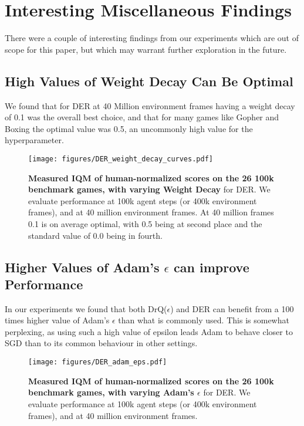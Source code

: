 \documentclass[10pt]{article} %
\begin{document}
\clearpage

\section{Interesting Miscellaneous Findings}
\label{sec:imf}
There were a couple of interesting findings from our experiments which are out of scope for this paper, but which may warrant further exploration in the future.

\subsection{High Values of Weight Decay Can Be Optimal}
We found that for DER at 40 Million environment frames having a weight decay of 0.1 was the overall best choice, and that for many games like Gopher and Boxing the optimal value was 0.5, an uncommonly high value for the hyperparameter. 
\begin{figure}[!ht]
    \centering
  \texttt{[image: figures/DER\_weight\_decay\_curves.pdf]}%
    \caption{
     \textbf{Measured IQM of human-normalized scores on the 26 100k benchmark games, with varying Weight Decay} for DER. We evaluate performance at 100k agent steps (or 400k environment frames), and at 40 million environment frames. At 40 million frames 0.1 is on average optimal, with 0.5 being at second place and the standard value of 0.0 being in fourth.
    }
    \label{fig:imf_wd}
\end{figure}

\subsection{Higher Values of Adam's $\epsilon$ can improve Performance}
In our experiments we found that both DrQ($\epsilon$) and DER can benefit from a 100 times higher value of Adam's $\epsilon$ than what is commonly used. This is somewhat perplexing, as using such a high value of epsilon leads Adam to behave closer to SGD than to its common behaviour in other settings.
\begin{figure}[!ht]
    \centering
  \texttt{[image: figures/DER\_adam\_eps.pdf]}%
    \caption{
     \textbf{Measured IQM of human-normalized scores on the 26 100k benchmark games, with varying Adam's $\epsilon$} for DER. We evaluate performance at 100k agent steps (or 400k environment frames), and at 40 million environment frames.
    }
    \label{fig:imf_adam_eps}
\end{figure}
\end{document}

